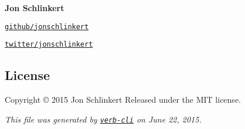 {\bfseries Jon Schlinkert}


\begin{DoxyItemize}
\item \href{https://github.com/jonschlinkert}{\tt github/jonschlinkert}
\item \href{http://twitter.com/jonschlinkert}{\tt twitter/jonschlinkert}
\end{DoxyItemize}

\subsection*{License}

Copyright © 2015 Jon Schlinkert Released under the M\+IT license.





{\itshape This file was generated by \href{https://github.com/assemble/verb-cli}{\tt verb-\/cli} on June 22, 2015.} 